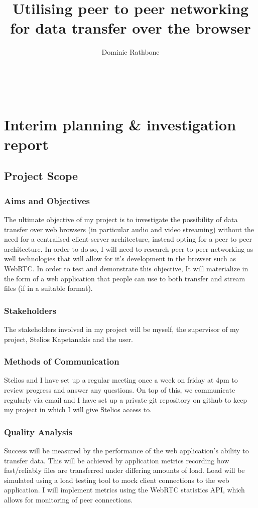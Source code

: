 \documentclass[]{report}
\title{Utilising peer to peer networking for data transfer over the browser}
\author{Dominic Rathbone}
\begin{document}
\maketitle
\tableofcontents
\


\chapter{Interim planning \& investigation report}
	\section{Project Scope}
		\subsection*{Aims and Objectives}
			The ultimate objective of my project is to investigate the possibility of data transfer over web browsers (in particular audio and video streaming) without the need for a centralised client-server architecture, instead opting for a peer to peer architecture. In order to do so, I will need to research peer to peer networking as well technologies that will allow for it's development in the browser such as WebRTC. In order to test and demonstrate this objective, It will materialize in the form of a web application that people can use to both transfer and stream files (if in a suitable format).
		\subsection*{Stakeholders}
			The stakeholders involved in my project will be myself, the supervisor of my project, Stelios Kapetanakis and the user.
		\subsection*{Methods of Communication}
			Stelios and I have set up a regular meeting once a week on friday at 4pm to review progress and answer any questions. On top of this, we communicate regularly via email and I have set up a private git repository on github to keep my project in which I will give Stelios access to.
		\subsection*{Quality Analysis}
			Success will be measured by the performance of the web application's ability to transfer data. This will be achieved by application metrics recording how fast/reliably files are transferred under differing amounts of load. Load will be simulated using a load testing tool to mock client connections to the web application. I will implement metrics using the WebRTC statistics API, which allows for monitoring of peer connections.
		
\end{document}

